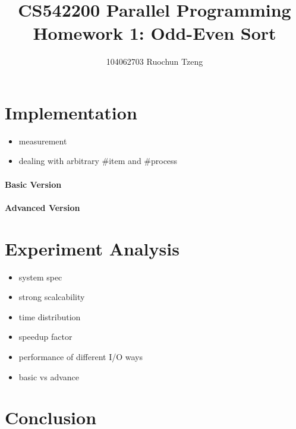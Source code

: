 \documentclass{article}
\begin{document}
\title{CS542200 Parallel Programming Homework 1: Odd-Even Sort}
\author{104062703 Ruochun Tzeng}
\maketitle
\section{Implementation}
\begin{itemize}
\item measurement
\item dealing with arbitrary \#item and \#process
\end{itemize}
\paragraph{Basic Version}
\paragraph{Advanced Version}
\section{Experiment Analysis}
\begin{itemize}
\item system spec
\item strong scalcability
\item time distribution
\item speedup factor
\item performance of different I/O ways
\item basic vs advance
\end{itemize}
\section{Conclusion}
\end{document}
